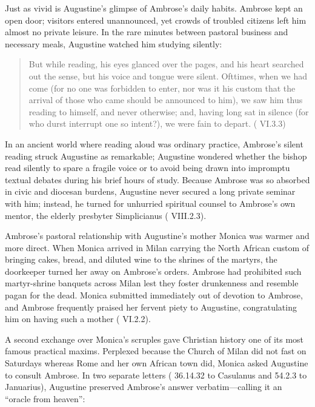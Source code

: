Just as vivid is Augustine's glimpse of Ambrose's daily habits. Ambrose kept an open door; visitors entered unannounced, yet crowds of troubled citizens left him almost no private leisure. In the rare minutes between pastoral business and necessary meals, Augustine watched him studying silently:

\begin{quote}
But while reading, his eyes glanced over the pages, and his heart searched out the sense, but his voice and tongue were silent. Ofttimes, when we had come (for no one was forbidden to enter, nor was it his custom that the arrival of those who came should be announced to him), we saw him thus reading to himself, and never otherwise; and, having long sat in silence (for who durst interrupt one so intent?), we were fain to depart. ( VI.3.3)
\end{quote}

In an ancient world where reading aloud was ordinary practice, Ambrose's silent reading struck Augustine as remarkable; Augustine wondered whether the bishop read silently to spare a fragile voice or to avoid being drawn into impromptu textual debates during his brief hours of study. Because Ambrose was so absorbed in civic and diocesan burdens, Augustine never secured a long private seminar with him; instead, he turned for unhurried spiritual counsel to Ambrose's own mentor, the elderly presbyter Simplicianus ( VIII.2.3).

Ambrose's pastoral relationship with Augustine's mother Monica was warmer and more direct. When Monica arrived in Milan carrying the North African custom of bringing cakes, bread, and diluted wine to the shrines of the martyrs, the doorkeeper turned her away on Ambrose's orders. Ambrose had prohibited such martyr-shrine banquets across Milan lest they foster drunkenness and resemble pagan  for the dead. Monica submitted immediately out of devotion to Ambrose, and Ambrose frequently praised her fervent piety to Augustine, congratulating him on having such a mother ( VI.2.2).

A second exchange over Monica's scruples gave Christian history one of its most famous practical maxims. Perplexed because the Church of Milan did not fast on Saturdays whereas Rome and her own African town did, Monica asked Augustine to consult Ambrose. In two separate letters ( 36.14.32 to Casulanus and  54.2.3 to Januarius), Augustine preserved Ambrose's answer verbatim---calling it an ``oracle from heaven'':


